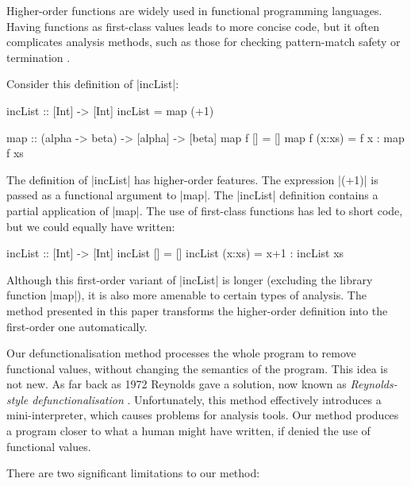 \documentclass{sigplanconf}
\begin{document}
Higher-order functions are widely used in functional programming languages.  Having functions as first-class values leads to more concise code, but it often complicates analysis methods, such as those for checking pattern-match safety \cite{me:catch} or termination \cite{sereni:higher_order_termination}.

\begin{example}
\label{ex:incList}

Consider this definition of |incList|:

\begin{code}
incList :: [Int] -> [Int]
incList = map (+1)

map :: (alpha -> beta) -> [alpha] -> [beta]
map f []      = []
map f (x:xs)  = f x : map f xs
\end{code}

The definition of |incList| has higher-order features. The expression |(+1)| is passed as a functional argument to |map|. The |incList| definition contains a partial application of |map|. The use of first-class functions has led to short code, but we could equally have written:

\begin{code}
incList :: [Int] -> [Int]
incList []      = []
incList (x:xs)  = x+1 : incList xs
\end{code}

Although this first-order variant of |incList| is longer (excluding the library function |map|), it is also more amenable to certain types of analysis. The method presented in this paper transforms the higher-order definition into the first-order one automatically.
\end{example}

\smallskip

Our defunctionalisation method processes the whole program to remove functional values, without changing the semantics of the program. This idea is not new. As far back as 1972 Reynolds gave a solution, now known as \textit{Reynolds-style defunctionalisation} \cite{reynolds:defunc}. Unfortunately, this method effectively introduces a mini-interpreter, which causes problems for analysis tools. Our method produces a program closer to what a human might have written, if denied the use of functional values.

There are two significant limitations to our method:

\negsmallskip
\end{document}

